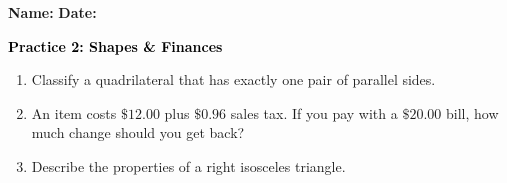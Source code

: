 \documentclass[12pt, letterpaper, fleqn]{article}
\begin{document}
\textbf{Name:} \underline{\hspace{5cm}}
\hfill
\textbf{Date:} \underline{\hspace{3cm}}\\

\begin{tcolorbox}[colback=customteal!20]
    \large\textcolor{black}{\textbf{Practice 2: Shapes \& Finances}}
\end{tcolorbox}
\begin{enumerate}[itemsep=3.5cm, leftmargin=0.6cm]
\item Classify a quadrilateral that has exactly one pair of parallel sides.
\vspace{3.5cm}
\item An item costs $\$12.00$ plus $\$0.96$ sales tax. If you pay with a $\$20.00$ bill, how much change should you get back?
\vspace{3.5cm}
\item Describe the properties of a right isosceles triangle.
\end{enumerate}
\end{document}

